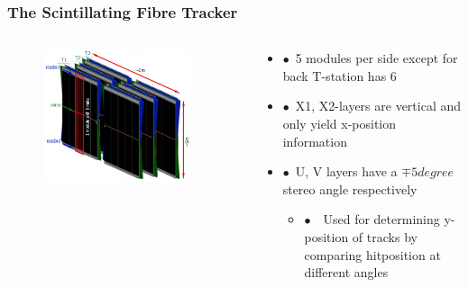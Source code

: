 \documentclass[aspectratio=1610, 12pt, xcolor=dvipsnames]{beamer}
\begin{document}
\begin{frame}\frametitle{The Scintillating Fibre Tracker}
  \begin{columns}
    \begin{column}[c]{0.48\textwidth}
      \begin{figure}
        \includegraphics[width=0.9\textwidth]{logos/scifi.png}
      \end{figure}
    \end{column}
    \begin{column}{0.48\textwidth}
      \begin{itemize}
        \item $\bullet$\, 5 modules per side except for back T-station has 6
        \item $\bullet$\, X1, X2-layers are vertical and only yield x-position information
        \item $\bullet$\, U, V layers have a $\mp 5 \si{degree}$ stereo angle respectively
        \begin{itemize}
          \item $\bullet$\, \to\, Used for determining y-position of tracks by comparing hitposition at different angles
        \end{itemize}
      \end{itemize}
    \end{column}
  \end{columns}
\end{frame}
\end{document}

